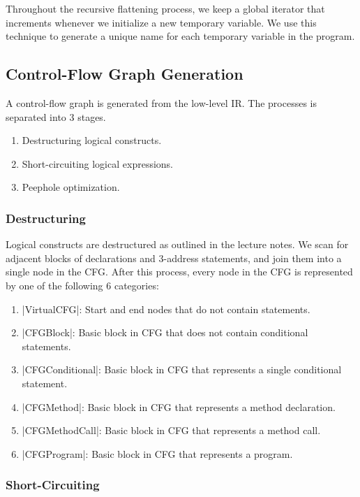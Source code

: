 Throughout the recursive flattening process, we keep a global iterator that increments whenever we initialize a new temporary variable. We use this technique to generate a unique name for each temporary variable in the program.

\subsection{Control-Flow Graph Generation}

A control-flow graph is generated from the low-level IR. The processes is separated into 3 stages.
\begin{enumerate}
    \item Destructuring logical constructs.
    \item Short-circuiting logical expressions.
    \item Peephole optimization.
\end{enumerate}

\subsubsection{Destructuring}

Logical constructs are destructured as outlined in the lecture notes. We scan for adjacent blocks of declarations and 3-address statements, and join them into a single node in the CFG. After this process, every node in the CFG is represented by one of the following 6 categories:
\begin{enumerate}
    \item |VirtualCFG|: Start and end nodes that do not contain statements.
    \item |CFGBlock|: Basic block in CFG that does not contain conditional statements.
    \item |CFGConditional|: Basic block in CFG that represents a single conditional statement.
    \item |CFGMethod|: Basic block in CFG that represents a method declaration.
    \item |CFGMethodCall|: Basic block in CFG that represents a method call.
    \item |CFGProgram|: Basic block in CFG that represents a program.
\end{enumerate}

\subsubsection{Short-Circuiting}

